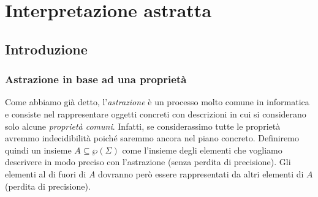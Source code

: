 \documentclass[a4paper,oneside,titlepage]{book}
\begin{document}
\chapter{Interpretazione astratta}

\section{Introduzione} %
\subsection{Astrazione in base ad una proprietà}
Come abbiamo già detto, l'\textit{astrazione} è un processo molto comune in informatica e consiste nel rappresentare oggetti concreti con descrizioni in cui si considerano solo alcune \textit{proprietà comuni}. Infatti, se considerassimo tutte le proprietà avremmo indecidibilità poiché saremmo ancora nel piano concreto. Definiremo quindi un insieme $A \subseteq \wp(\Sigma)$ come l'insieme degli elementi che vogliamo descrivere in modo preciso con l'astrazione (senza perdita di precisione). Gli elementi al di fuori di $A$ dovranno però essere rappresentati da altri elementi di $A$ (perdita di precisione).
\end{document}
